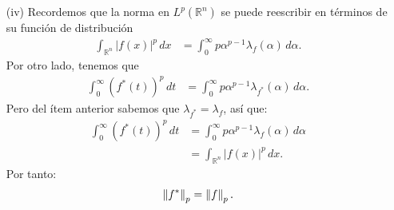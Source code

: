 \begin{homeworkProblem}
\begin{solution}
\begin{itemize}
\begin{align*}
        \end{align*}
        Esto equivale a decir que
        \begin{align*}
          t < \lambda_f(s), \quad \text{para todo } s \leq \alpha.
        \end{align*}
        En particular, si tomamos el ínfimo sobre todos esos $s \leq \alpha$, se obtiene
        \begin{align*}
          t < \inf_{s \leq \alpha} \lambda_f(s) = \lambda_f(\alpha),
        \end{align*}
        pues $\lambda_f$ es no creciente.\\
        Por tanto,
        \begin{align*}
          f^*(t) > \alpha \quad \Leftrightarrow \quad t < \lambda_f(\alpha),
        \end{align*}
        lo que implica que
        \begin{align*}
          \lambda_{f^*}(\alpha) &= m\left( \left\{ t > 0 : f^*(t) > \alpha \right\} \right) \\
          &= m\left( \left\{ t > 0 : t < \lambda_f(\alpha) \right\} \right) \\
          &= \lambda_f(\alpha).
        \end{align*}
        Esto concluye que $\lambda_{f^*} = \lambda_f$.
      \item[(iv)] Recordemos que la norma en $L^{p}(\mathbb{R}^{n})$ se puede reescribir en términos de su función de distribución
        \begin{align*}
          \int_{\mathbb{R}^n} |f(x)|^p \, dx 
          &= \int_0^\infty p \alpha^{p-1} \lambda_f(\alpha) \, d\alpha.
        \end{align*}
        Por otro lado, tenemos que 
        \begin{align*}
          \int_0^\infty (f^*(t))^p \, dt 
          &= \int_0^\infty p \alpha^{p-1} \lambda_{f^*}(\alpha) \, d\alpha.
        \end{align*}
        Pero del ítem anterior sabemos que $\lambda_{f^*} = \lambda_f$, as\'i que:
        \begin{align*}
          \int_0^\infty (f^*(t))^p \, dt 
          &= \int_0^\infty p \alpha^{p-1} \lambda_f(\alpha) \, d\alpha \\
          &= \int_{\mathbb{R}^n} |f(x)|^p \, dx.
        \end{align*}
        Por tanto:
        \begin{align*}
          \left\|f^*\right\|_p = \left\|f\right\|_p.
        \end{align*}

\end{itemize}
\end{solution}
\end{homeworkProblem}
